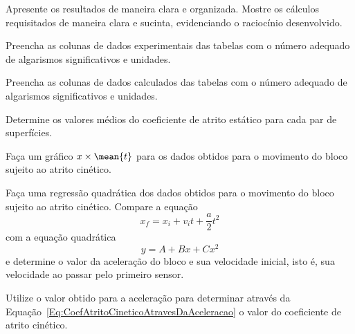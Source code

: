 \begin{question}[type={exam}]{1}
Apresente os resultados de maneira clara e organizada. Mostre os cálculos requisitados de maneira clara e sucinta, evidenciando o raciocínio desenvolvido.
\end{question}

\begin{question}[type={exam}]{1}
Preencha as colunas de dados experimentais das tabelas com o número adequado de algarismos significativos e unidades.
\end{question}

\begin{question}[type={exam}]{1}
Preencha as colunas de dados calculados das tabelas com o número adequado de algarismos significativos e unidades.
\end{question}

\begin{question}[type={exam}]{1}
Determine os valores médios do coeficiente de atrito estático para cada par de superfícies.
\end{question}

\begin{question}[type={exam}]{2}
Faça um gráfico $x \times \mean{t}$ para os dados obtidos para o movimento do bloco sujeito ao atrito cinético.
\end{question}

\begin{question}[type={exam}]{2}
Faça uma regressão quadrática dos dados obtidos para o movimento do bloco sujeito ao atrito cinético. Compare a equação
\begin{equation}
    x_f = x_i + v_i t + \frac{a}{2} t^2
\end{equation}
%
com a equação quadrática
\begin{equation}
    y = A + B x + C x^2
\end{equation}
%
e determine o valor da aceleração do bloco e sua velocidade inicial, isto é, sua velocidade ao passar pelo primeiro sensor.
\end{question}

\begin{question}[type={exam}]{2}
Utilize o valor obtido para a aceleração para determinar através da Equação~\ref{Eq:CoefAtritoCineticoAtravesDaAceleracao} o valor do coeficiente de atrito cinético.
\end{question}

\vfill
\pagebreak
